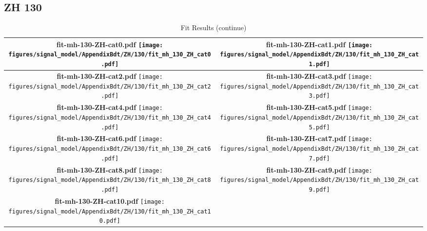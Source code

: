 \subsection{ZH 130}
\begin{longtable}{|c|c|}
\caption{Fit Results}
\endfirsthead
\caption{Fit Results (continue)}
\endhead
\hline
\parbox{0.47\textwidth}{
\centering
{\bfseries fit-mh-130-ZH-cat0.pdf}
\texttt{[image: figures/signal\_model/AppendixBdt/ZH/130/fit\_mh\_130\_ZH\_cat0.pdf]}
}
 & \parbox{0.47\textwidth}{
\centering
{\bfseries fit-mh-130-ZH-cat1.pdf}
\texttt{[image: figures/signal\_model/AppendixBdt/ZH/130/fit\_mh\_130\_ZH\_cat1.pdf]}
}
 \\
\hline
\parbox{0.47\textwidth}{
\centering
{\bfseries fit-mh-130-ZH-cat2.pdf}
\texttt{[image: figures/signal\_model/AppendixBdt/ZH/130/fit\_mh\_130\_ZH\_cat2.pdf]}
}
 & \parbox{0.47\textwidth}{
\centering
{\bfseries fit-mh-130-ZH-cat3.pdf}
\texttt{[image: figures/signal\_model/AppendixBdt/ZH/130/fit\_mh\_130\_ZH\_cat3.pdf]}
}
 \\
\hline
\parbox{0.47\textwidth}{
\centering
{\bfseries fit-mh-130-ZH-cat4.pdf}
\texttt{[image: figures/signal\_model/AppendixBdt/ZH/130/fit\_mh\_130\_ZH\_cat4.pdf]}
}
 & \parbox{0.47\textwidth}{
\centering
{\bfseries fit-mh-130-ZH-cat5.pdf}
\texttt{[image: figures/signal\_model/AppendixBdt/ZH/130/fit\_mh\_130\_ZH\_cat5.pdf]}
}
 \\
\hline
\parbox{0.47\textwidth}{
\centering
{\bfseries fit-mh-130-ZH-cat6.pdf}
\texttt{[image: figures/signal\_model/AppendixBdt/ZH/130/fit\_mh\_130\_ZH\_cat6.pdf]}
}
 & \parbox{0.47\textwidth}{
\centering
{\bfseries fit-mh-130-ZH-cat7.pdf}
\texttt{[image: figures/signal\_model/AppendixBdt/ZH/130/fit\_mh\_130\_ZH\_cat7.pdf]}
}
 \\
\hline
\parbox{0.47\textwidth}{
\centering
{\bfseries fit-mh-130-ZH-cat8.pdf}
\texttt{[image: figures/signal\_model/AppendixBdt/ZH/130/fit\_mh\_130\_ZH\_cat8.pdf]}
}
 & \parbox{0.47\textwidth}{
\centering
{\bfseries fit-mh-130-ZH-cat9.pdf}
\texttt{[image: figures/signal\_model/AppendixBdt/ZH/130/fit\_mh\_130\_ZH\_cat9.pdf]}
}
 \\
\hline
\parbox{0.47\textwidth}{
\centering
{\bfseries fit-mh-130-ZH-cat10.pdf}
\texttt{[image: figures/signal\_model/AppendixBdt/ZH/130/fit\_mh\_130\_ZH\_cat10.pdf]}
}
 & \parbox{0.47\textwidth}{
}
\end{longtable}
